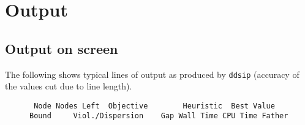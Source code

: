\documentclass[11pt,draft]{article}
\newcommand{\+}{{\ti{+}}}
\newcommand{\1}{{\ti{1}}}
\begin{document}
\section{Output} \label{S:OUT}
\subsection{Output on screen}
The following shows typical lines of output as produced by \texttt{ddsip} (accuracy of the values cut due to line length).
%
\begin{figure}[ht]
{\tiny
\begin{verbatim}
 Node Nodes Left  Objective        Heuristic  Best Value    Bound     Viol./Dispersion    Gap Wall Time CPU Time Father

\end{verbatim}}
\end{figure}
\end{document}
